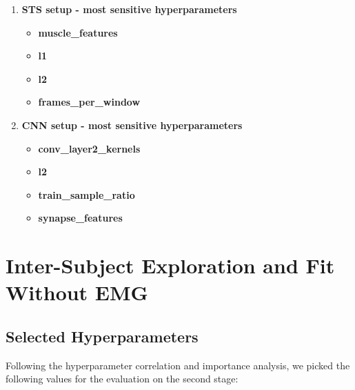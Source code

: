 \begin{enumerate}
    \item \textbf{STS setup - most sensitive hyperparameters}
    \begin{itemize}
        \item \textbf{muscle\_features}
        \item \textbf{l1}
        \item \textbf{l2}
        \item \textbf{frames\_per\_window}
    \end{itemize}

    \item \textbf{CNN setup - most sensitive hyperparameters}
    \begin{itemize}
        \item \textbf{conv\_layer2\_kernels}
        \item \textbf{l2}
        \item \textbf{train\_sample\_ratio}
        \item \textbf{synapse\_features}
    \end{itemize}
\end{enumerate}

\section{Inter-Subject Exploration and Fit Without EMG}

\subsection{Selected Hyperparameters}

Following the hyperparameter correlation and importance analysis, we picked the following values for the evaluation on the second stage:


